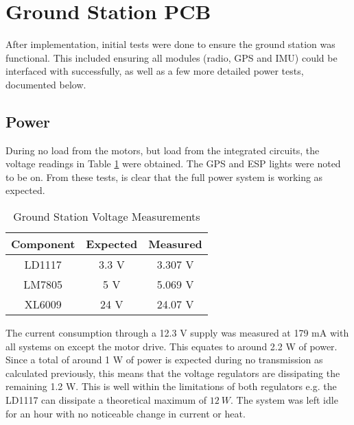 \section{Ground Station PCB}

After implementation, initial tests were done to ensure the ground station was functional. This included ensuring all modules (radio, GPS and IMU) could be interfaced with successfully, as well as a few more detailed power tests, documented below.

\subsection{Power}

During no load from the motors, but load from the integrated circuits, the voltage readings in Table \ref{tab:gs_pcb_voltage} were obtained. The GPS and ESP lights were noted to be on. From these tests, is clear that the full power system is working as expected.
\begin{table}[!htb]
  \centering
  \renewcommand{\arraystretch}{1.2}
  \begin{tabular}{ |c|c|c| }
  \hline
  \textbf{Component}        & \textbf{Expected}     & \textbf{Measured}  \\
  \hline
  LD1117                 &  3.3 V             & 3.307 V \\  \hline
  LM7805                 &  5 V               & 5.069 V \\  \hline
  XL6009                 &  24 V             & 24.07 V  \\ \hline
  \end{tabular}
  \caption{Ground Station Voltage Measurements}
  \label{tab:gs_pcb_voltage}
\end{table}

The current consumption through a 12.3 V supply was measured at 179 mA with all systems on except the motor drive. This equates to around 2.2 W of power. Since a total of around 1 W of power is expected during no transmission as calculated previously, this means that the voltage regulators are dissipating the remaining 1.2 W. This is well within the limitations of both regulators e.g. the LD1117 can dissipate a theoretical maximum of $\SI{12}{W}$. The system was left idle for an hour with no noticeable change in current or heat.

